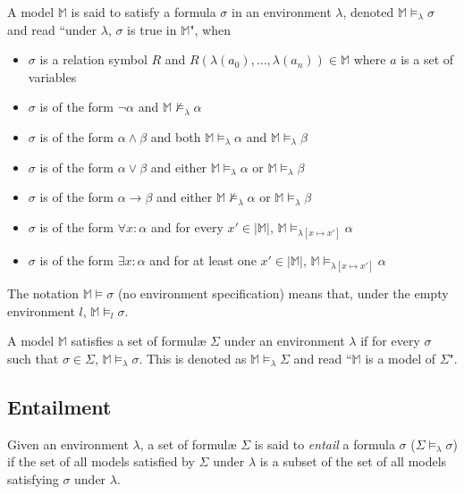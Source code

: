 		A model $\mathbb{M}$ is said to satisfy a formula $\sigma$ in an
		environment $\lambda$, denoted $\mathbb{M} \models_\lambda \sigma$ and
		read ``under $\lambda$, $\sigma$ is true in $\mathbb{M}$", when
		\begin{itemize}
		\item $\sigma$ is a relation symbol $R$ and $R(\lambda(a_0) , \ldots , \lambda(a_n)) \in \mathbb{M}$ where $a$ is a set of variables
		\item $\sigma$ is of the form $\neg\alpha$ and $\mathbb{M} \not\models_\lambda \alpha$
		\item $\sigma$ is of the form $\alpha\wedge\beta$ and both $\mathbb{M} \models_\lambda \alpha$ and $\mathbb{M} \models_\lambda \beta$
		\item $\sigma$ is of the form $\alpha\vee\beta$ and either $\mathbb{M} \models_\lambda \alpha$ or $\mathbb{M} \models_\lambda \beta$
		\item $\sigma$ is of the form $\alpha\to\beta$ and either $\mathbb{M} \not\models_\lambda \alpha$ or $\mathbb{M} \models_\lambda \beta$
		\item $\sigma$ is of the form $\forall x : \alpha$  and for every $x' \in |\mathbb{M}|$, $\mathbb{M} \models_{\lambda[x \mapsto x']} \alpha$
		\item $\sigma$ is of the form $\exists x : \alpha$  and for at least one $x' \in |\mathbb{M}|$, $\mathbb{M} \models_{\lambda[x \mapsto x']} \alpha$
		\end{itemize}
		The notation $\mathbb{M} \models \sigma$ (no environment specification)
		means that, under the empty environment $l$, $\mathbb{M} \models_l \sigma$.

		A model $\mathbb{M}$ satisfies a set of formul{\ae} $\Sigma$ under an
		environment $\lambda$ if for every $\sigma$ such that $\sigma \in
		\Sigma$, $\mathbb{M} \models_\lambda \sigma$. This is denoted as
		$\mathbb{M} \models_\lambda \Sigma$ and read ``$\mathbb{M}$ is a model
		of $\Sigma$".

	\subsection{Entailment}

		Given an environment $\lambda$, a set of formul{\ae} $\Sigma$ is said
		to \emph{entail} a formula $\sigma$ ($\Sigma \models_\lambda \sigma$)
		if the set of all models satisfied by $\Sigma$ under $\lambda$ is a
		subset of the set of all models satisfying $\sigma$ under $\lambda$.

